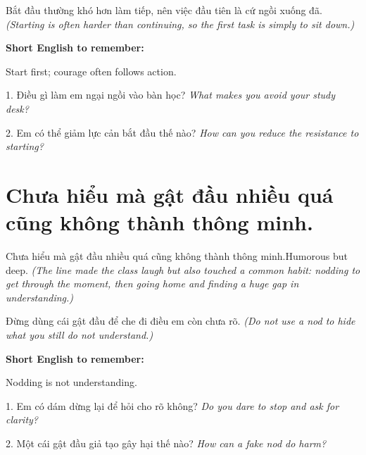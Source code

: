 \begin{baihoc}
Bắt đầu thường khó hơn làm tiếp, nên việc đầu tiên là cứ ngồi xuống đã.
\textit{(Starting is often harder than continuing, so the first task is simply to sit down.)}
\end{baihoc}

\begin{ghinhoanh}
\textbf{Short English to remember:}

Start first; courage often follows action.

\end{ghinhoanh}

\begin{tuhocnhanh}
1. Điều gì làm em ngại ngồi vào bàn học? \textit{What makes you avoid your study desk?}

2. Em có thể giảm lực cản bắt đầu thế nào? \textit{How can you reduce the resistance to starting?}
\end{tuhocnhanh}
\ngancach

\section{Chưa hiểu mà gật đầu nhiều quá cũng không thành thông minh.}
\begin{truyen}{Chưa hiểu mà gật đầu nhiều quá cũng không thành thông minh.}{Humorous but deep.}
\textit{(The line made the class laugh but also touched a common habit: nodding to get through the moment, then going home and finding a huge gap in understanding.)}
\end{truyen}

\begin{baihoc}
Đừng dùng cái gật đầu để che đi điều em còn chưa rõ.
\textit{(Do not use a nod to hide what you still do not understand.)}
\end{baihoc}

\begin{ghinhoanh}
\textbf{Short English to remember:}

Nodding is not understanding.

\end{ghinhoanh}

\begin{tuhocnhanh}
1. Em có dám dừng lại để hỏi cho rõ không? \textit{Do you dare to stop and ask for clarity?}

2. Một cái gật đầu giả tạo gây hại thế nào? \textit{How can a fake nod do harm?}
\end{tuhocnhanh}
\ngancach

